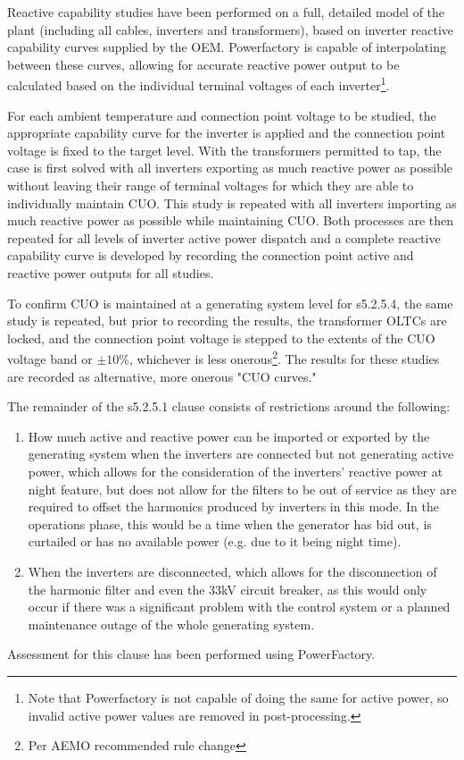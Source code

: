 Reactive capability studies have been performed on a full, detailed model of the plant (including all cables, inverters and transformers), based on inverter reactive capability curves supplied by the OEM. Powerfactory is capable of interpolating between these curves, allowing for accurate reactive power output to be calculated based on the individual terminal voltages of each inverter\footnote{Note that Powerfactory is not capable of doing the same for active power, so invalid active power values are removed in post-processing.}. 

For each ambient temperature and connection point voltage to be studied, the appropriate capability curve for the inverter is applied and the connection point voltage is fixed to the target level. With the transformers permitted to tap, the case is first solved with all inverters exporting as much reactive power as possible without leaving their range of terminal voltages for which they are able to individually maintain \ac{CUO}. This study is repeated with all inverters importing as much reactive power as possible while maintaining \ac{CUO}. Both processes are then repeated for all levels of inverter active power dispatch and a complete reactive capability curve is developed by recording the connection point active and reactive power outputs for all studies.

To confirm \ac{CUO} is maintained at a generating system level for s5.2.5.4, the same study is repeated, but prior to recording the results, the transformer \acp{OLTC} are locked, and the connection point voltage is stepped to the extents of the \ac{CUO} voltage band or $\pm10\%$, whichever is less onerous\footnote{Per AEMO recommended rule change}. The results for these studies are recorded as alternative, more onerous "\ac{CUO} curves."

The remainder of the s5.2.5.1 clause consists of restrictions around the following:

\begin{enumerate}
	\item How much active and reactive power can be imported or exported by the generating system when the inverters are connected but not generating active power, which allows for the consideration of the inverters' reactive power at night feature, but does not allow for the filters to be out of service as they are required to offset the harmonics produced by inverters in this mode. In the operations phase, this would be a time when the generator has bid out, is curtailed or has no available power (e.g. due to it being night time).
	\item When the inverters are disconnected, which allows for the disconnection of the harmonic filter and even the 33kV circuit breaker, as this would only occur if there was a significant problem with the control system or a planned maintenance outage of the whole generating system.
\end{enumerate} 

Assessment for this clause has been performed using PowerFactory.